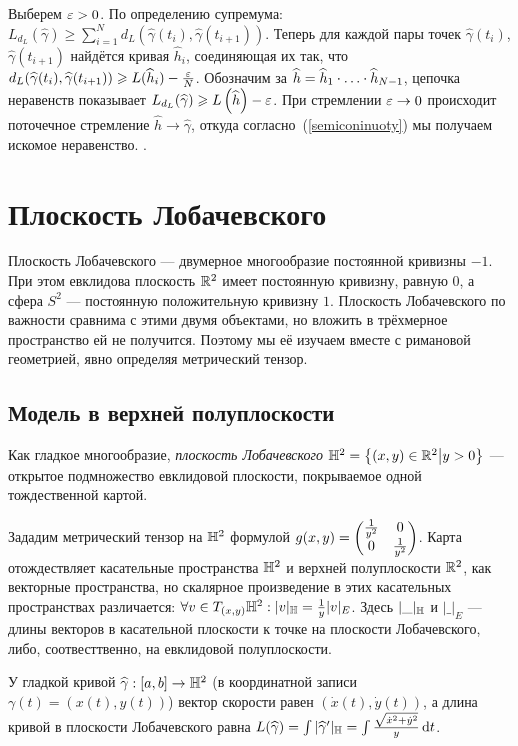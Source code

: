 \documentclass[a4paper]{report}
\begin{document}
{{{    Выберем $\varepsilon > 0$. По определению супремума: $L_{d_L}(\hat{\gamma}) \ge \sum\limits_{i = 1}^{N}d_L(\hat{\gamma}(t_i), \hat{\gamma}(t_{i+1}))$.
    Теперь для каждой пары точек $\hat{\gamma}(t_i)$, $\hat{\gamma}(t_{i+1})$ найдётся кривая $\hat{h}_i$, соединяющая их так, что $d_L(\widehat{\gamma}(t_i), \widehat{\gamma}(t_{i+1})) \geqslant L(\widehat{h}_i) - \frac{\varepsilon}{N}$.
    Обозначим за $\widehat{h} = \widehat{h}_1 \cdot\ldots\cdot \widehat{h}_{N-1}$, цепочка неравенств показывает $L_{d_L}(\widehat{\gamma}) \geqslant L\left(\widehat{h}\right) - \varepsilon$.
    При стремлении $\varepsilon \to 0$ происходит поточечное стремление $\hat{h} \to \hat{\gamma}$, откуда согласно~(\cref{semiconinuoty}) мы получаем искомое неравенство.
        .
    }
    }
    }
    \chapter{Плоскость Лобачевского}
    Плоскость Лобачевского --- двумерное многообразие постоянной кривизны $-1$.
    При этом евклидова плоскость $\mathbb{R}^2$ имеет постоянную кривизну, равную $0$, а сфера $S^2$ --- постоянную положительную кривизну $1$.
    Плоскость Лобачевского по важности сравнима с этими двумя объектами, но вложить в трёхмерное пространство ей не получится.
    Поэтому мы её изучаем вместе с римановой геометрией, явно определяя метрический тензор.
    \section{Модель в верхней полуплоскости}
    Как гладкое многообразие, \emph{плоскость Лобачевского} $\mathbb{H}^2 = \left\{(x, y) \in \mathbb{R}^2\middle|y > 0\right\}$ --- открытое подмножество евклидовой плоскости, покрываемое одной тождественной картой.

    Зададим метрический тензор на $\mathbb{H}^2$ формулой $g(x, y) = \begin{pmatrix}\frac{1}{y^2} & 0 \\ 0 & \frac{1}{y^2}\end{pmatrix}$.
    Карта отождествляет касательные пространства $\mathbb{H}^2$ и верхней полуплоскости $\mathbb{R}^2$, как векторные пространства, но скалярное произведение в этих касательных пространствах различается: $\forall v \in T_{(x, y)}\mathbb{H}^2: |v|_{\mathbb{H}} = \frac{1}{y}|v|_{E}$.
    Здесь $|\_|_{\mathbb{H}}$ и $|\_|_{E}$ --- длины векторов в касательной плоскости к точке на плоскости Лобачевского, либо, соотвесттвенно, на евклидовой полуплоскости.

    У гладкой кривой $\widehat{\gamma}: [a, b] \rightarrow \mathbb{H}^2$ (в координатной записи $\gamma(t) = (x(t), y(t))$) вектор скорости равен $(\dot{x}(t), \dot{y}(t))$, а длина кривой в плоскости Лобачевского равна $L(\widehat{\gamma}) = \int|\widehat{\gamma}'|_{\mathbb{H}} = \int\frac{\sqrt{\dot{x}^2 + \dot{y}^2}}{y}\operatorname{d}\! t$.
\end{document}
